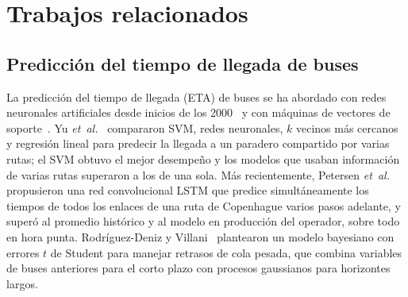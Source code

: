 \documentclass[conference,a4paper]{IEEEtran}
\begin{document}
\section{Trabajos relacionados}\label{sec:rel}

\subsection{Predicción del tiempo de llegada de buses}
La predicción del tiempo de llegada (ETA) de buses se ha abordado con redes neuronales artificiales desde inicios de los 2000~\cite{chien2002} y con máquinas de vectores de soporte~\cite{bin2006}. Yu \emph{et~al.}~\cite{yu2011} compararon SVM, redes neuronales, $k$ vecinos más cercanos y regresión lineal para predecir la llegada a un paradero compartido por varias rutas; el SVM obtuvo el mejor desempeño y los modelos que usaban información de varias rutas superaron a los de una sola. Más recientemente, Petersen \emph{et~al.}~\cite{petersen2019} propusieron una red convolucional LSTM que predice simultáneamente los tiempos de todos los enlaces de una ruta de Copenhague varios pasos adelante, y superó al promedio histórico y al modelo en producción del operador, sobre todo en hora punta. Rodríguez-Deniz y Villani~\cite{rodriguez2022} plantearon un modelo bayesiano con errores $t$ de Student para manejar retrasos de cola pesada, que combina variables de buses anteriores para el corto plazo con procesos gaussianos para horizontes largos.
\end{document}
